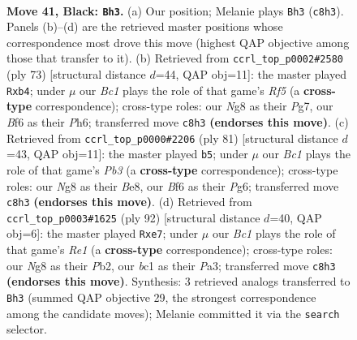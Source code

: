 \documentclass[11pt]{article}
\begin{document}
\clearpage

\begin{figure}[p]\centering
\begin{subfigure}{0.46\textwidth}\centering
\resizebox{\linewidth}{!}{%
\newchessgame
\chessboard[
  setfen={r1b2kn1/2R5/p1p2b2/8/8/8/6R1/1NB1K3 b - - 0 41},
  showmover=false,
  pgfstyle=straightmove, color=movearrow, markmove={c8-h3}
]}
\caption{}
\end{subfigure}\hfill
\begin{subfigure}{0.46\textwidth}\centering
\resizebox{\linewidth}{!}{%
\newchessgame
\chessboard[
  setfen={6k1/3R2p1/7p/2P5/1R3r2/8/5b1P/5K2 b - - 1 37},
  showmover=false,
  pgfstyle=straightmove, color=movearrow, markmove={f4-b4}
]}
\caption{}
\end{subfigure}
\\[4pt]
\begin{subfigure}{0.46\textwidth}\centering
\resizebox{\linewidth}{!}{%
\newchessgame
\chessboard[
  setfen={r3bk2/1R6/1p4pp/p7/4R3/8/5PP1/6K1 b - - 9 41},
  showmover=false,
  pgfstyle=straightmove, color=movearrow, markmove={b6-b5}
]}
\caption{}
\end{subfigure}\hfill
\begin{subfigure}{0.46\textwidth}\centering
\resizebox{\linewidth}{!}{%
\newchessgame
\chessboard[
  setfen={6k1/4r3/p4p2/8/B5b1/P2r4/1P6/K3R3 w - - 0 47},
  showmover=false,
  pgfstyle=straightmove, color=movearrow, markmove={e1-e7}
]}
\caption{}
\end{subfigure}
\caption{\textbf{Move 41, Black: \texttt{Bh3}.} (a) Our position; Melanie plays \texttt{Bh3} (\texttt{c8h3}). Panels (b)--(d) are the retrieved master positions whose correspondence most drove this move (highest QAP objective among those that transfer to it). (b) Retrieved from \texttt{ccrl\_top\_p0002\#2580} (ply 73) [structural distance $d$=44, QAP obj=11]: the master played \texttt{Rxb4}; under $\mu$ our \emph{Bc1} plays the role of that game's \emph{Rf5} (a \textbf{cross-type} correspondence); cross-type roles: our \emph{N}g8 as their \emph{P}g7, our \emph{B}f6 as their \emph{P}h6; transferred move \texttt{c8h3} \textbf{(endorses this move)}. (c) Retrieved from \texttt{ccrl\_top\_p0000\#2206} (ply 81) [structural distance $d$=43, QAP obj=11]: the master played \texttt{b5}; under $\mu$ our \emph{Bc1} plays the role of that game's \emph{Pb3} (a \textbf{cross-type} correspondence); cross-type roles: our \emph{N}g8 as their \emph{B}e8, our \emph{B}f6 as their \emph{P}g6; transferred move \texttt{c8h3} \textbf{(endorses this move)}. (d) Retrieved from \texttt{ccrl\_top\_p0003\#1625} (ply 92) [structural distance $d$=40, QAP obj=6]: the master played \texttt{Rxe7}; under $\mu$ our \emph{Bc1} plays the role of that game's \emph{Re1} (a \textbf{cross-type} correspondence); cross-type roles: our \emph{N}g8 as their \emph{P}b2, our \emph{b}c1 as their \emph{P}a3; transferred move \texttt{c8h3} \textbf{(endorses this move)}. Synthesis: 3 retrieved analogs transferred to \texttt{Bh3} (summed QAP objective 29, the strongest correspondence among the candidate moves); Melanie committed it via the \texttt{search} selector.}
\label{fig:thought-m81}
\end{figure}
\end{document}
